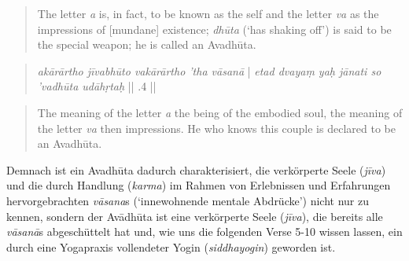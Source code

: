 \begin{quote}
  The letter \textit{a} is, in fact, to be known as the self and the letter \textit{va} as the impressions of [mundane] existence; \textit{dhūta} (`has shaking off') is said to be the special weapon; he is called an Avadhūta.
\end{quote}

\begin{quote}
  \textit{akārārtho jīvabhūto vakārārtho 'tha vāsanā} |
  \textit{etad dvayaṃ yaḥ jānati so 'vadhūta udāhṛtaḥ} || .4 ||
    \end{quote}

    \begin{quote}
      The meaning of the letter \textit{a} the being of the embodied soul, the meaning of the letter \textit{va} then impressions. He who knows this couple is declared to be an Avadhūta.
    \end{quote}
    
    Demnach ist ein Avadhūta dadurch charakterisiert, die verkörperte Seele (\textit{jīva}) und die durch Handlung (\textit{karma}) im Rahmen von Erlebnissen und Erfahrungen hervorgebrachten \textit{vāsana}s (`innewohnende mentale Abdrücke') nicht nur zu kennen, sondern der Avādhūta ist eine verkörperte Seele (\textit{jīva}), die bereits alle \textit{vāsanā}s abgeschüttelt hat und, wie uns die folgenden Verse  5-10 wissen lassen, ein durch eine Yogapraxis vollendeter Yogin (\textit{siddhayogin}) geworden ist.\\
    

